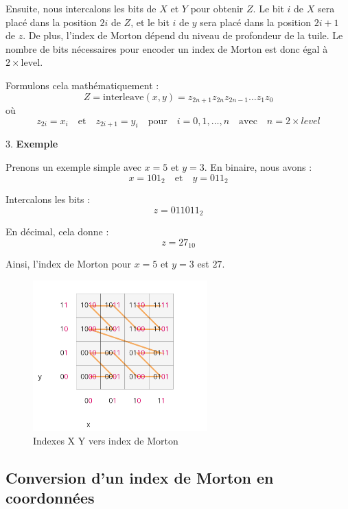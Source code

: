    Ensuite, nous intercalons les bits de \( X \) et \( Y \) pour obtenir \( Z \). Le bit \( i \) de \( X \) sera placé dans la position \( 2i \) de \( Z \), et le bit \( i \) de \( y \) sera placé dans la position \( 2i + 1 \) de \( z \). De plus, l'index de Morton dépend du niveau de profondeur de la tuile. Le nombre de bits nécessaires pour encoder un index de Morton est donc égal à \(2 \times \text{level}\).

   Formulons cela mathématiquement :
   \[
   Z = \text{interleave}(x, y) = z_{2n+1} z_{2n} z_{2n-1} \ldots z_1 z_0
   \]
   où
   \[
   z_{2i} = x_i \quad \text{et} \quad z_{2i+1} = y_i \quad \text{pour} \quad i = 0, 1, \ldots, n \quad \text{avec} \quad n = 2 \times {level}
   \]

3. \textbf{Exemple}

   Prenons un exemple simple avec \( x = 5 \) et \( y = 3 \). En binaire, nous avons :
   \[
   x = 101_2 \quad \text{et} \quad y = 011_2
   \]

   Intercalons les bits :
   \[
   z = 011011_2
   \]

   En décimal, cela donne :
   \[
   z = 27_{10}
   \]

Ainsi, l'index de Morton pour \( x = 5 \) et \( y = 3 \) est \( 27 \).

\begin{figure}[H]
    \centering
    \includegraphics[width=0.6\textwidth]{assets/figures/global-to-local-xy.png}
    \caption{Indexes X Y vers index de Morton \cite{availability-gh}}
    \label{fig:xy-morton}
\end{figure}

\subsection*{Conversion d'un index de Morton en coordonnées}

